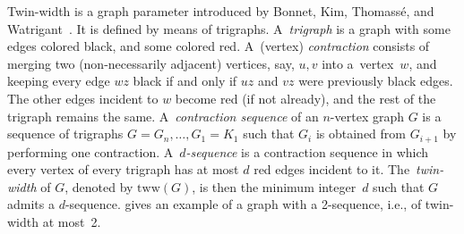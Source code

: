 \documentclass[a4paper,UKenglish,cleveref,hyperref,autoref]{lipics-v2021}
\newcommand{\tww}{\text{tww}}
\begin{document}
Twin-width is a graph parameter introduced by Bonnet, Kim, Thomassé, and Watrigant~\cite{twin-width1}.
It is defined by means of trigraphs.
A~\emph{trigraph} is a graph with some edges colored black, and some colored red.
A~(vertex) \emph{contraction} consists of merging two (non-necessarily adjacent) vertices, say, $u, v$ into a~vertex~$w$, and keeping every edge $wz$ black if and only if $uz$ and $vz$ were previously black edges.
The other edges incident to $w$ become red (if not already), and the rest of the trigraph remains the same.
A~\emph{contraction sequence} of an $n$-vertex graph $G$ is a sequence of trigraphs $G=G_n, \ldots, G_1=K_1$ such that $G_i$ is obtained from $G_{i+1}$ by performing one contraction.
A~\mbox{\emph{$d$-sequence}} is a contraction sequence in which every vertex of every trigraph has at most $d$ red edges incident to it.
The~\emph{twin-width} of $G$, denoted by $\tww(G)$, is then the minimum integer~$d$ such that $G$ admits a $d$-sequence.
 gives an example of a graph with a 2-sequence, i.e., of twin-width at most~2.
\end{document}
